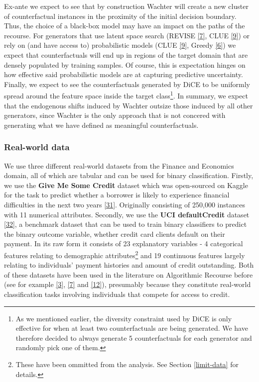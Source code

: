 \documentclass[conference,final,]{IEEEtran}
\theoremstyle{definition}
\theoremstyle{definition}
\theoremstyle{definition}
\theoremstyle{definition}
\theoremstyle{remark}
\begin{document}
Ex-ante we expect to see that by construction Wachter will create a new cluster of counterfactual instances in the proximity of the initial decision boundary. Thus, the choice of a black-box model may have an impact on the paths of the recourse. For generators that use latent space search (REVISE \protect\hyperlink{ref-joshi2019towards}{{[}7{]}}, CLUE \protect\hyperlink{ref-antoran2020getting}{{[}9{]}}) or rely on (and have access to) probabilistic models (CLUE \protect\hyperlink{ref-antoran2020getting}{{[}9{]}}, Greedy \protect\hyperlink{ref-schut2021generating}{{[}6{]}}) we expect that counterfactuals will end up in regions of the target domain that are densely populated by training samples. Of course, this is expectation hinges on how effective said probabilistic models are at capturing predictive uncertainty. Finally, we expect to see the counterfactuals generated by DiCE to be uniformly spread around the feature space inside the target class\footnote{As we mentioned earlier, the diversity constraint used by DiCE is only effective for when at least two counterfactuals are being generated. We have therefore decided to always generate 5 counterfactuals for each generator and randomly pick one of them.}. In summary, we expect that the endogenous shifts induced by Wachter outsize those induced by all other generators, since Wachter is the only approach that is not concered with generating what we have defined as meaningful counterfactuals.

\hypertarget{real-world-data}{%
\subsubsection{Real-world data}\label{real-world-data}}

We use three different real-world datasets from the Finance and Economics domain, all of which are tabular and can be used for binary classification. Firstly, we use the \textbf{Give Me Some Credit} dataset which was open-sourced on Kaggle for the task to predict whether a borrower is likely to experience financial difficulties in the next two years \protect\hyperlink{ref-gmsc_data}{{[}31{]}}. Originally consisting of 250,000 instances with 11 numerical attributes. Secondly, we use the \textbf{UCI defaultCredit} dataset \protect\hyperlink{ref-yeh2009comparisons}{{[}32{]}}, a benchmark dataset that can be used to train binary classifiers to predict the binary outcome variable, whether credit card clients default on their payment. In its raw form it consists of 23 explanatory variables - 4 categorical features relating to demographic attributes\footnote{These have been ommitted from the analysis. See Section \ref{limit-data} for details.} and 19 continuous features largely relating to individuals' payment histories and amount of credit outstanding. Both of these datasets have been used in the literature on Algorithmic Recourse before (see for example \protect\hyperlink{ref-pawelczyk2021carla}{{[}3{]}}, \protect\hyperlink{ref-joshi2019towards}{{[}7{]}} and \protect\hyperlink{ref-ustun2019actionable}{{[}12{]}}), presumably because they constitute real-world classification tasks involving individuals that compete for access to credit.
\end{document}
